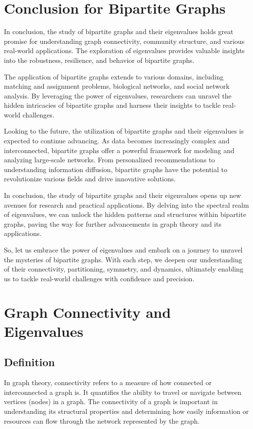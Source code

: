 \documentclass{article}
\begin{document}
\section{Conclusion for Bipartite Graphs}
In conclusion, the study of bipartite graphs and their eigenvalues holds great promise for understanding graph connectivity, community structure, and various real-world applications. The exploration of eigenvalues provides valuable insights into the robustness, resilience, and behavior of bipartite graphs.

The application of bipartite graphs extends to various domains, including matching and assignment problems, biological networks, and social network analysis. By leveraging the power of eigenvalues, researchers can unravel the hidden intricacies of bipartite graphs and harness their insights to tackle real-world challenges.

Looking to the future, the utilization of bipartite graphs and their eigenvalues is expected to continue advancing. As data becomes increasingly complex and interconnected, bipartite graphs offer a powerful framework for modeling and analyzing large-scale networks. From personalized recommendations to understanding information diffusion, bipartite graphs have the potential to revolutionize various fields and drive innovative solutions.

In conclusion, the study of bipartite graphs and their eigenvalues opens up new avenues for research and practical applications. By delving into the spectral realm of eigenvalues, we can unlock the hidden patterns and structures within bipartite graphs, paving the way for further advancements in graph theory and its applications.

So, let us embrace the power of eigenvalues and embark on a journey to unravel the mysteries of bipartite graphs. With each step, we deepen our understanding of their connectivity, partitioning, symmetry, and dynamics, ultimately enabling us to tackle real-world challenges with confidence and precision.

\section{Graph Connectivity and Eigenvalues}
\subsection{Definition}
In graph theory, connectivity refers to a measure of how connected or interconnected a graph is. It quantifies the ability to travel or navigate between vertices (nodes) in a graph. The connectivity of a graph is important in understanding its structural properties and determining how easily information or resources can flow through the network represented by the graph.
\end{document}
